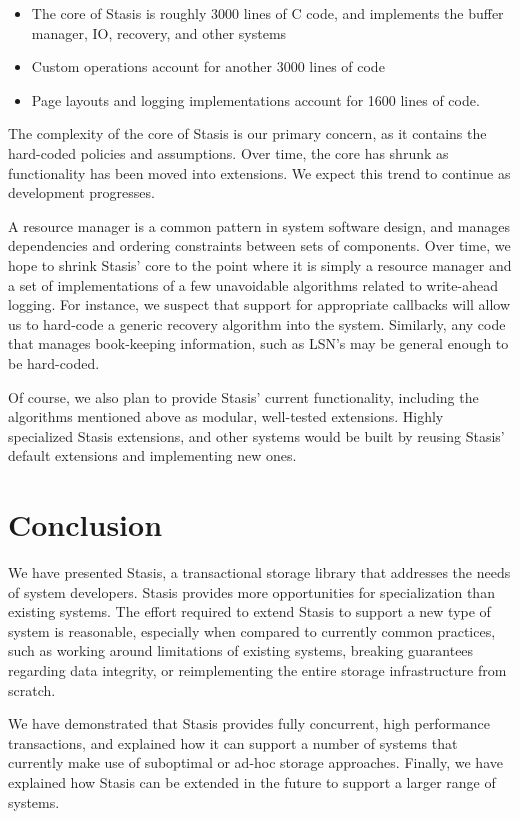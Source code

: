 \documentclass[letterpaper,twocolumn,10pt]{article}
\newcommand{\yad}{Stasis\xspace}
\newcommand{\yads}{Stasis'\xspace}
\begin{document}
\begin{itemize}
\item The core of \yad is roughly 3000 lines
of C code, and implements the buffer manager, IO, recovery, and other
systems
\item Custom operations account for another 3000 lines of code
\item Page layouts and logging implementations account for 1600 lines of code.
\end{itemize}

The complexity of the core of \yad is our primary concern, as it
contains the hard-coded policies and assumptions.  Over time, the core has
shrunk as functionality has been moved into extensions.  We expect
this trend to continue as development progresses.  

A resource manager
is a common pattern in system software design, and manages
dependencies and ordering constraints between sets of components.
Over time, we hope to shrink \yads core to the point where it is
simply a resource manager and a set of implementations of a few unavoidable
algorithms related to write-ahead logging.  For instance, 
we suspect that support for appropriate callbacks will 
allow us to hard-code a generic recovery algorithm into the 
system.  Similarly, any code that manages book-keeping information, such as 
LSN's may be general enough to be hard-coded.  

Of course, we also plan to provide \yads current functionality, including the algorithms
mentioned above as modular, well-tested extensions.
Highly specialized \yad extensions, and other systems would be built
by reusing \yads default extensions and implementing new ones.


\section{Conclusion}

We have presented \yad, a transactional storage library that addresses
the needs of system developers.  \yad provides more opportunities for
specialization than existing systems.  The effort required to extend
\yad to support a new type of system is reasonable, especially when
compared to currently common practices, such as working around
limitations of existing systems, breaking guarantees regarding data
integrity, or reimplementing the entire storage infrastructure from
scratch.

We have demonstrated that \yad provides fully
concurrent, high performance transactions, and explained how it can
support a number of systems that currently make use of suboptimal or
ad-hoc storage approaches.  Finally, we have explained how \yad can be
extended in the future to support a larger range of systems.
\end{document}
